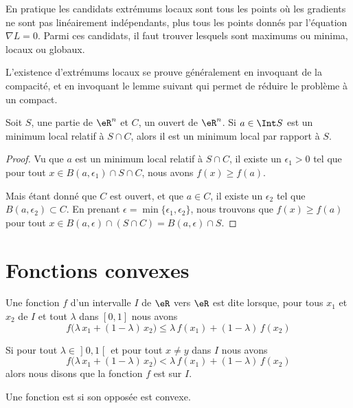 En pratique les candidats extrémums locaux sont tous les points où les gradients ne sont pas linéairement indépendants, plus tous les points donnés par l'équation \( \nabla L=0\). Parmi ces candidats, il faut trouver lesquels sont maximums ou minima, locaux ou globaux.

L'existence d'extrémums locaux se prouve généralement en invoquant de la compacité, et en invoquant le lemme suivant qui permet de réduire le problème à un compact.

\begin{lemma}       \label{LemmeMinSCimpliqueS}
	Soit \( S\), une partie de \( \eR^n\) et \( C\), un ouvert de \( \eR^n\). Si \( a\in\Int S\) est un minimum local relatif à \( S\cap C\), alors il est un minimum local par rapport à \( S\).
\end{lemma}

\begin{proof}
	Vu que \( a\) est un minimum local relatif à \( S\cap C\), il existe un \( \epsilon_1> 0\) tel que pour tout \( x\in B(a,\epsilon_1)\cap S\cap C\), nous avons \( f(x)\geq f(a)\).

	Mais étant donné que \( C\) est ouvert, et que \( a\in C\), il existe un \( \epsilon_2\) tel que \( B(a,\epsilon_2)\subset C\). En prenant \( \epsilon=\min\{ \epsilon_1,\epsilon_2 \}\), nous trouvons que \( f(x)\geq f(a)\) pour tout \( x\in B(a,\epsilon)\cap(S\cap C)=B(a,\epsilon)\cap S\).
\end{proof}

\section{Fonctions convexes}
\label{SECooVZWWooUjxXYi}

\begin{definition}  \label{DefVQXRJQz}
	Une fonction \( f\) d’un intervalle \( I\) de \( \eR\) vers \( \eR\) est dite  lorsque, pour tous \( x_1\) et \( x_2\) de \( I\) et tout \( \lambda\) dans \( [0, 1]\) nous avons
	\begin{equation}        \label{EQooYNAPooFePQZy}
		f\big(\lambda\, x_1+(1-\lambda)\, x_2\big) \leq \lambda\, f(x_1)+(1-\lambda)\, f(x_2)
	\end{equation}

	Si pour tout \( \lambda\in \mathopen] 0 , 1 \mathclose[\) et pour tout \( x\neq y\) dans \( I\) nous avons
	\begin{equation}
		f\big(\lambda\, x_1+(1-\lambda)\, x_2\big) < \lambda\, f(x_1)+(1-\lambda)\, f(x_2)
	\end{equation}
	alors nous disons que la fonction \( f\) est  sur \( I\).

	Une fonction est  si son opposée est convexe.
\end{definition}

